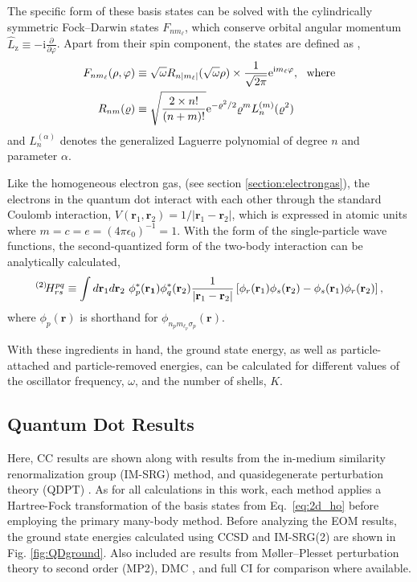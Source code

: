 \documentclass[thesis.tex]{subfiles}
\begin{document}
The specific form of these basis states can be solved with the cylindrically symmetric Fock--Darwin states $F_{n m_{\ell}}$, which conserve orbital angular momentum $\hat{L}_{\mathrm{z}} \equiv -\mathrm{i} \frac{\partial}{\partial \varphi}$.  Apart from their spin component, the states are defined as \cite{lohne2010coupled},
\begin{align}
  F_{n m_{\ell}}(\rho, \varphi) &\equiv \sqrt\omega R_{n |m_\ell|}(\sqrt \omega \rho) \times \frac{1}{\sqrt{2 \pi}} \mathrm{e}^{\mathrm{i} m_\ell \varphi} \label{eq:fockdarwin},\ \ \text{where} \\
  R_{n m}(\varrho) &\equiv \sqrt{\frac{2 \times n!}{(n + m)!}} \mathrm{e}^{-\varrho^2 / 2} \varrho^m L_n^{(m)}(\varrho^2) \notag
\end{align}
and $L_n^{(\alpha)}$ denotes the generalized Laguerre polynomial \cite{NIST:DLMF} of degree $n$ and parameter $\alpha$.

Like the homogeneous electron gas, (see section \ref{section:electrongas}), the electrons in the quantum dot interact with each other through the standard Coulomb interaction, $V\left( \mathbf{r}_{1}, \mathbf{r}_{2}\right) = 1/\lvert \mathbf{r}_{1} - \mathbf{r}_{2} \rvert$, which is expressed in atomic units where $m = c = e = (4\pi\epsilon_{0})^{-1} = 1$.  With the form of the single-particle wave functions, the second-quantized form of the two-body interaction can be analytically calculated,
\begin{equation} \label{eq:coloumb_integral}
  \Hint{2}{pq}{rs} \equiv \int d\mathbf{r}_{1} d\mathbf{r}_{2}\ \phi^{*}_{p}(\mathbf{r_{1}})\phi^{*}_{q}(\mathbf{r}_{2}) \frac{1}{\lvert \mathbf{r}_{1} - \mathbf{r}_{2} \rvert} \left[\phi_{r}(\mathbf{r}_{1})\phi_{s}(\mathbf{r}_{2}) - \phi_{s}(\mathbf{r}_{1})\phi_{r}(\mathbf{r}_{2})\right],
\end{equation}
where $\phi_{p}(\mathbf{r})$ is shorthand for $\phi_{n_{p} m_{\ell_{p}}\sigma_{p}}(\mathbf{r})$.

With these ingredients in hand, the ground state energy, as well as particle-attached and particle-removed energies, can be calculated for different values of the oscillator frequency, $\omega$, and the number of shells, $K$.

\subsection{Quantum Dot Results}

Here, CC results are shown along with results from the in-medium similarity renormalization group (IM-SRG) method, and quasidegenerate perturbation theory (QDPT) \cite{LINDGREN1974}.  As for all calculations in this work, each method applies a Hartree-Fock transformation of the basis states from Eq.\ \eqref{eq:2d_ho} before employing the primary many-body method.  Before analyzing the EOM results, the ground state energies calculated using CCSD and IM-SRG(2) are shown in Fig. \ref{fig:QDground}.  Also included are results from M\o ller--Plesset perturbation theory to second order (MP2), DMC \cite{HOGBERGET2013}, and full CI \cite{OLSEN2013} for comparison where available.
\end{document}
